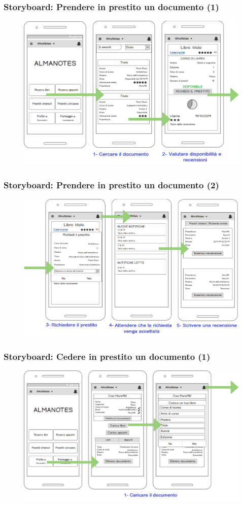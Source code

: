 \documentclass{beamer}
\begin{document}
\begin{frame}
\frametitle{Storyboard: Prendere in prestito un documento (1)}
\begin{figure}
\includegraphics[width=0.95\linewidth]{images/storyboard1.png}
\end{figure}
\end{frame}
\begin{frame}
\frametitle{Storyboard: Prendere in prestito un documento (2)}
\begin{figure}
\includegraphics[width=0.95\linewidth]{images/storyboard2.png}
\end{figure}
\end{frame}
\begin{frame}
\frametitle{Storyboard: Cedere in prestito un documento (1)}
\begin{figure}
\includegraphics[width=0.95\linewidth]{images/storyboard3.png}
\end{figure}
\end{frame}
\end{document}
